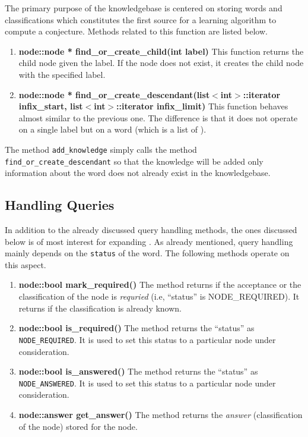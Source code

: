 The primary purpose of the knowledgebase is centered on storing words and classifications which constitutes the first source for a learning algorithm to compute a conjecture. Methods related to this function are listed below.
	
\begin{enumerate}
\item \textbf{node::node * find\_or\_create\_child(int label)} \vskip 1pt
	This function returns the child node given the label. If the node does not exist, it creates the child node with the specified label.
	
\item \textbf{node::node * find\_or\_create\_descendant(list$<$int$>$::iterator infix\_start, list$<$int$>$::iterator infix\_limit)} \hfill \vskip 1pt
	This function behaves almost similar to the previous one. The difference is that it does not operate on a single label but on a word (which is a list of \integer). 
\end{enumerate}	

 The method \texttt{add\_knowledge} simply calls the method \texttt{find\_or\_create\_descendant} so that the knowledge will be added only information about the word does not already exist in the knowledgebase.


\subsection*{Handling Queries}
In addition to the already discussed query handling methods, the ones discussed below is of most interest for expanding \libalf. 
As already mentioned, query handling mainly depends on the \texttt{status} of the word. The following methods operate on this aspect. 
\begin{enumerate}
\item \textbf{node::bool mark\_required()} \vskip 1pt
The method returns \true if the acceptance or the classification of the node is \emph{requried} (i.e, ``status'' is NODE\_REQUIRED). It returns \false if the classification is already known.
	
\item \textbf{node::bool is\_required()} \vskip 1pt
The method returns the ``status'' as \texttt{NODE\_REQUIRED}. It is used to set this status to a particular node under consideration.

\item \textbf{node::bool is\_answered()} \vskip 1pt
The method returns the ``status'' as \texttt{NODE\_ANSWERED}. It is used to set this status to a particular node under consideration.
	
\item \textbf{node::answer get\_answer()} \vskip 1pt
The method returns the \emph{answer} (classification of the node) stored for the node. 
\end{enumerate}

